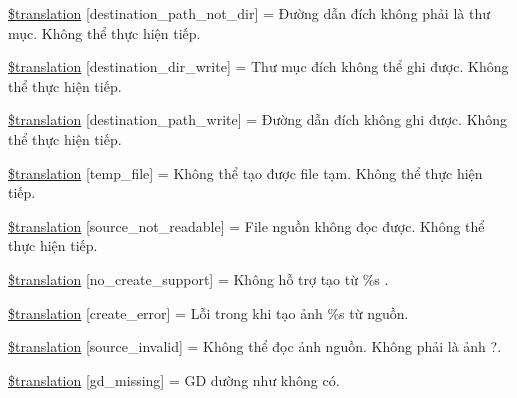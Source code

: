 \begin{DoxyCompactItemize}
\item 
\hyperlink{class_8upload_8vn___v_n_8php_a5704a67137126e8c87b7a364175929d4}{\$translation} \mbox{[}\textquotesingle{}destination\+\_\+path\+\_\+not\+\_\+dir\textquotesingle{}\mbox{]} = \textquotesingle{}Đường dẫn đích không phải là thư mục. Không thể thực hiện tiếp.\textquotesingle{}
\item 
\hyperlink{class_8upload_8vn___v_n_8php_a97608ea194a616db49141a0e6dee900c}{\$translation} \mbox{[}\textquotesingle{}destination\+\_\+dir\+\_\+write\textquotesingle{}\mbox{]} = \textquotesingle{}Thư mục đích không thể ghi được. Không thể thực hiện tiếp.\textquotesingle{}
\item 
\hyperlink{class_8upload_8vn___v_n_8php_a40e4e1962226b89fd76da5819a9602b0}{\$translation} \mbox{[}\textquotesingle{}destination\+\_\+path\+\_\+write\textquotesingle{}\mbox{]} = \textquotesingle{}Đường dẫn đích không ghi được. Không thể thực hiện tiếp.\textquotesingle{}
\item 
\hyperlink{class_8upload_8vn___v_n_8php_a2baece8da11e20d45175db91851ec3e3}{\$translation} \mbox{[}\textquotesingle{}temp\+\_\+file\textquotesingle{}\mbox{]} = \textquotesingle{}Không thể tạo được file tạm. Không thể thực hiện tiếp.\textquotesingle{}
\item 
\hyperlink{class_8upload_8vn___v_n_8php_a922967ca2df0efdd455261142d8e5715}{\$translation} \mbox{[}\textquotesingle{}source\+\_\+not\+\_\+readable\textquotesingle{}\mbox{]} = \textquotesingle{}File nguồn không đọc được. Không thể thực hiện tiếp.\textquotesingle{}
\item 
\hyperlink{class_8upload_8vn___v_n_8php_a346dfd1ade29f583dd20d345c436859f}{\$translation} \mbox{[}\textquotesingle{}no\+\_\+create\+\_\+support\textquotesingle{}\mbox{]} = \textquotesingle{}Không hỗ trợ tạo từ \%s .\textquotesingle{}
\item 
\hyperlink{class_8upload_8vn___v_n_8php_a53013ce9255c4e1849098ddd9fdb2b3f}{\$translation} \mbox{[}\textquotesingle{}create\+\_\+error\textquotesingle{}\mbox{]} = \textquotesingle{}Lỗi trong khi tạo ảnh \%s từ nguồn.\textquotesingle{}
\item 
\hyperlink{class_8upload_8vn___v_n_8php_a6ab0a660b457eaf2d3434b225449fdd6}{\$translation} \mbox{[}\textquotesingle{}source\+\_\+invalid\textquotesingle{}\mbox{]} = \textquotesingle{}Không thể đọc ảnh nguồn. Không phải là ảnh ?.\textquotesingle{}
\item 
\hyperlink{class_8upload_8vn___v_n_8php_a7f3dfcc0db4bbc0f2e7210c439798e56}{\$translation} \mbox{[}\textquotesingle{}gd\+\_\+missing\textquotesingle{}\mbox{]} = \textquotesingle{}G\+D dường như không có.\textquotesingle{}

\end{DoxyCompactItemize}
